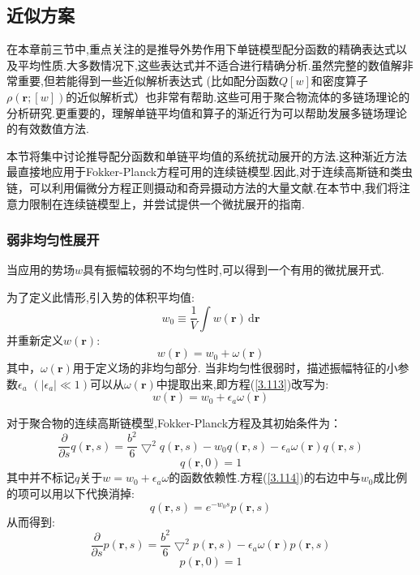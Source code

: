 \subsection{近似方案}
在本章前三节中,重点关注的是推导外势作用下单链模型配分函数的精确表达式以及平均性质.大多数情况下,这些表达式并不适合进行精确分析.虽然完整的数值解非常重要,但若能得到一些近似解析表达式
(比如配分函数$Q[w]$和密度算子$\rho(\mathbf{r};[w])$的近似解析式）也非常有帮助.这些可用于聚合物流体的多链场理论的分析研究.更重要的，理解单链平均值和算子的渐近行为可以帮助发展多链场理论的有效数值方法.

本节将集中讨论推导配分函数和单链平均值的系统扰动展开的方法.这种渐近方法最直接地应用于Fokker-Planck方程可用的连续链模型.因此,对于连续高斯链和类虫链，可以利用偏微分方程正则摄动和奇异摄动方法的大量文献.在本节中,我们将注意力限制在连续链模型上，并尝试提供一个微扰展开的指南.
\subsubsection{弱非均匀性展开}
当应用的势场$w$具有振幅较弱的不均匀性时,可以得到一个有用的微扰展开式.

为了定义此情形,引入势的体积平均值:
\begin{equation}
w_0\equiv \frac{1}{V} \int w(\mathbf{r})\,\mathrm{d}\mathbf{r}
\end{equation}
并重新定义$w(\mathbf{r})$:
\begin{equation}
w(\mathbf{r})=w_0+\omega(\mathbf{r}) \label{3.113}
\end{equation}
其中，$\omega(\mathbf{r})$用于定义场的非均匀部分.
当非均匀性很弱时，描述振幅特征的小参数$\epsilon_a$ $(|\epsilon_a| \ll 1)$可以从$\omega(\mathbf{r})$中提取出来,即方程(\ref{3.113})改写为:
$$w(\mathbf{r})=w_0+\epsilon_a \omega(\mathbf{r})$$

对于聚合物的连续高斯链模型,Fokker-Planck方程及其初始条件为：
\begin{equation}
\frac{\partial}{\partial s} q(\mathbf{r},s) = \frac{b^2}{6} \bigtriangledown^2 q(\mathbf{r},s) -w_0 q(\mathbf{r},s) -\epsilon_a \omega(\mathbf{r}) q(\mathbf{r},s) \label{3.114}
\end{equation}
\begin{equation}
q(\mathbf{r},0) = 1 \label{3.115}
\end{equation}
其中并不标记$q$关于$w = w_0+\epsilon_a \omega$的函数依赖性.方程(\ref{3.114})的右边中与$w_0$成比例的项可以用以下代换消掉:
\begin{equation}
q(\mathbf{r},s) = e^{-w_0 s} p(\mathbf{r},s)
\end{equation}
从而得到:
\begin{equation}
\frac{\partial}{\partial s} p(\mathbf{r},s) = \frac{b^2}{6} \bigtriangledown^2 p(\mathbf{r},s) -\epsilon_a \omega(\mathbf{r}) p(\mathbf{r},s) \label{3.117}
\end{equation}
\begin{equation}
p(\mathbf{r},0) = 1 \label{3.118}
\end{equation}

